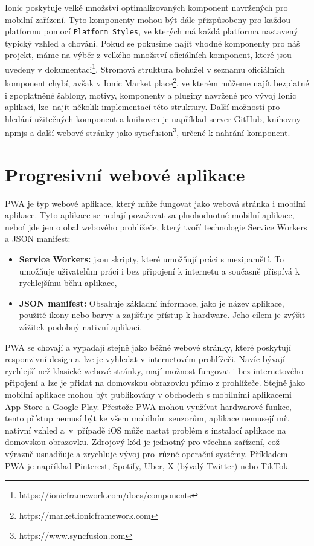 \documentclass[czech, bc, kiv, he, iso690numb]{fasthesis}
\begin{document}
Ionic poskytuje velké množství optimalizovaných komponent navržených pro mobilní zařízení. Tyto komponenty mohou být dále přizpůsobeny pro každou platformu pomocí \texttt{Platform Styles}, ve kterých má každá platforma nastavený typický vzhled a chování. Pokud se pokusíme najít vhodné komponenty pro náš projekt, máme na výběr z velkého množství oficiálních komponent, které jsou uvedeny v dokumentaci\footnote{https://ionicframework.com/docs/components}. Stromová struktura bohužel v seznamu oficiálních komponent chybí, avšak v Ionic Market place\footnote{https://market.ionicframework.com}, ve kterém můžeme najít bezplatné i zpoplatněné šablony, motivy, komponenty a pluginy navržené pro vývoj Ionic aplikací, lze~najít několik implementací této struktury. Další možností pro hledání užitečných komponent a knihoven je například server GitHub, knihovny npmjs a další webové stránky jako syncfusion\footnote{https://www.syncfusion.com}, určené k nahrání komponent. 


\section{Progresivní webové aplikace} \label{progressive_web_app}

\gls{PWA} je typ webové aplikace, který může fungovat jako webová stránka i mobilní aplikace. Tyto aplikace se nedají považovat za plnohodnotné mobilní aplikace, neboť jde jen o obal webového prohlížeče, který tvoří technologie Service Workers a \gls{JSON} manifest:

\begin{itemize}
    \item \textbf{Service Workers:} jsou skripty, které umožňují práci s mezipamětí. To umožňuje uživatelům práci i bez připojení k internetu a současně přispívá k rychlejšímu běhu aplikace,
    \item \textbf{\gls{JSON} manifest:} Obsahuje základní informace, jako je název aplikace, použité ikony nebo barvy a zajišťuje přístup k hardware. Jeho cílem je zvýšit zážitek podobný nativní aplikaci.
\end{itemize}

\gls{PWA} se chovají a vypadají stejně jako běžné webové stránky, které poskytují responzivní design a~lze je vyhledat v internetovém prohlížeči. Navíc bývají rychlejší než klasické webové stránky, mají možnost fungovat i bez internetového připojení a lze je přidat na domovskou obrazovku přímo z prohlížeče. Stejně jako mobilní aplikace mohou být publikovány v obchodech s mobilními aplikacemi App Store a Google Play. Přestože \gls{PWA} mohou využívat hardwarové funkce, tento přístup nemusí být ke všem mobilním senzorům, aplikace nemusejí mít nativní vzhled a~v~případě iOS může nastat problém s instalací aplikace na domovskou obrazovku. Zdrojový kód je jednotný pro všechna zařízení, což výrazně usnadňuje a zrychluje vývoj pro~různé operační systémy. Příkladem \gls{PWA} je například Pinterest, Spotify, Uber, X (bývalý Twitter) nebo TikTok. \cite{progressive_web_apps} \cite{pwa-vue}
\end{document}

